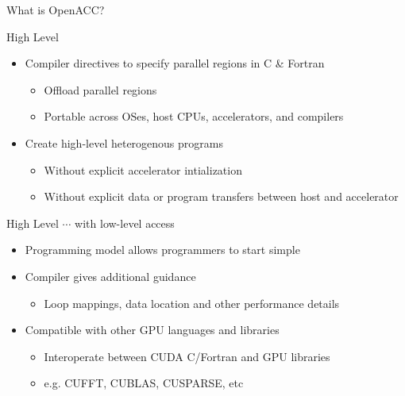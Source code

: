 \documentclass[10pt,t]{beamer}
\begin{document}
\begin{frame}{What is OpenACC?}
  \vspace{-0.5cm}
  \begin{exampleblock}{High Level}
    \begin{itemize}
      \item Compiler directives to specify parallel regions in C \& Fortran
      \begin{itemize}
        \item Offload parallel regions
        \item Portable across OSes, host CPUs, accelerators, and compilers
      \end{itemize}
      \item Create high-level heterogenous programs
      \begin{itemize}
        \item Without explicit accelerator intialization
        \item Without explicit data or program transfers between host and accelerator
      \end{itemize}
    \end{itemize}
  \end{exampleblock}
  \begin{exampleblock}{High Level $\cdots$ with low-level access}
    \begin{itemize}
      \item Programming model allows programmers to start simple
      \item Compiler gives additional guidance
      \begin{itemize}
        \item Loop mappings, data location and other performance details
      \end{itemize}
      \item Compatible with other GPU languages and libraries
      \begin{itemize}
        \item Interoperate between CUDA C/Fortran and GPU libraries
        \item e.g. CUFFT, CUBLAS, CUSPARSE, etc
      \end{itemize}
    \end{itemize}
  \end{exampleblock}
\end{frame}
\end{document}
